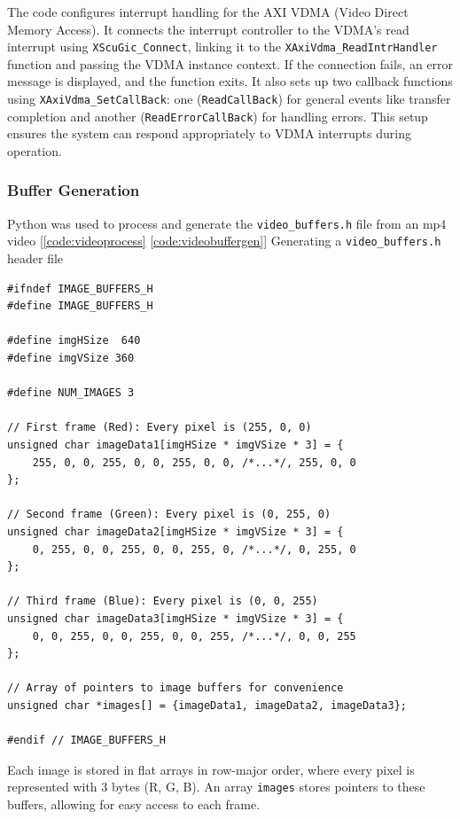 \documentclass{article}
\begin{document}
The code configures interrupt handling for the AXI VDMA (Video Direct Memory Access). It connects the interrupt controller to the VDMA's read interrupt using \verb|XScuGic_Connect|, linking it to the \verb|XAxiVdma_ReadIntrHandler| function and passing the VDMA instance context. If the connection fails, an error message is displayed, and the function exits. It also sets up two callback functions using \verb|XAxiVdma_SetCallBack|: one (\verb|ReadCallBack|) for general events like transfer completion and another (\verb|ReadErrorCallBack|) for handling errors. This setup ensures the system can respond appropriately to VDMA interrupts during operation.

\subsubsection{Buffer Generation}

Python was used to process and generate the \verb|video_buffers.h| file from an mp4 video [\cref{code:videoprocess} \cref{code:videobuffergen}]
Generating a \verb|video_buffers.h| header file

\begin{listing}[H]
    \begin{verbatim}
#ifndef IMAGE_BUFFERS_H
#define IMAGE_BUFFERS_H

#define imgHSize  640
#define imgVSize 360

#define NUM_IMAGES 3

// First frame (Red): Every pixel is (255, 0, 0)
unsigned char imageData1[imgHSize * imgVSize * 3] = {
    255, 0, 0, 255, 0, 0, 255, 0, 0, /*...*/, 255, 0, 0
};

// Second frame (Green): Every pixel is (0, 255, 0)
unsigned char imageData2[imgHSize * imgVSize * 3] = {
    0, 255, 0, 0, 255, 0, 0, 255, 0, /*...*/, 0, 255, 0
};

// Third frame (Blue): Every pixel is (0, 0, 255)
unsigned char imageData3[imgHSize * imgVSize * 3] = {
    0, 0, 255, 0, 0, 255, 0, 0, 255, /*...*/, 0, 0, 255
};

// Array of pointers to image buffers for convenience
unsigned char *images[] = {imageData1, imageData2, imageData3};

#endif // IMAGE_BUFFERS_H
    \end{verbatim}
\end{listing}
 
Each image is stored in flat arrays in row-major order, where every pixel is represented with 3 bytes (R, G, B). An array \verb|images| stores pointers to these buffers, allowing for easy access to each frame. 
\end{document}
